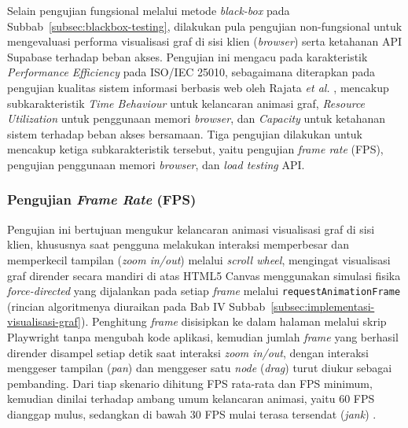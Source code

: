 Selain pengujian fungsional melalui metode \textit{black-box} pada Subbab~\ref{subsec:blackbox-testing}, dilakukan pula pengujian non-fungsional untuk mengevaluasi performa visualisasi graf di sisi klien (\textit{browser}) serta ketahanan API Supabase terhadap beban akses. Pengujian ini mengacu pada karakteristik \textit{Performance Efficiency} pada ISO/IEC 25010, sebagaimana diterapkan pada pengujian kualitas sistem informasi berbasis web oleh Rajata \textit{et al.} \cite{Rajata2026SPP}, mencakup subkarakteristik \textit{Time Behaviour} untuk kelancaran animasi graf, \textit{Resource Utilization} untuk penggunaan memori \textit{browser}, dan \textit{Capacity} untuk ketahanan sistem terhadap beban akses bersamaan. Tiga pengujian dilakukan untuk mencakup ketiga subkarakteristik tersebut, yaitu pengujian \textit{frame rate} (FPS), pengujian penggunaan memori \textit{browser}, dan \textit{load testing} API.

\subsubsection{Pengujian \textit{Frame Rate} (FPS)}
Pengujian ini bertujuan mengukur kelancaran animasi visualisasi graf di sisi klien, khususnya saat pengguna melakukan interaksi memperbesar dan memperkecil tampilan (\textit{zoom in/out}) melalui \textit{scroll wheel}, mengingat visualisasi graf dirender secara mandiri di atas HTML5 Canvas menggunakan simulasi fisika \textit{force-directed} yang dijalankan pada setiap \textit{frame} melalui \texttt{requestAnimationFrame} (rincian algoritmenya diuraikan pada Bab IV Subbab~\ref{subsec:implementasi-visualisasi-graf}). Penghitung \textit{frame} disisipkan ke dalam halaman melalui skrip Playwright tanpa mengubah kode aplikasi, kemudian jumlah \textit{frame} yang berhasil dirender disampel setiap detik saat interaksi \textit{zoom in/out}, dengan interaksi menggeser tampilan (\textit{pan}) dan menggeser satu \textit{node} (\textit{drag}) turut diukur sebagai pembanding. Dari tiap skenario dihitung FPS rata-rata dan FPS minimum, kemudian dinilai terhadap ambang umum kelancaran animasi, yaitu 60 FPS dianggap mulus, sedangkan di bawah 30 FPS mulai terasa tersendat (\textit{jank}) \cite{Zhao2025}.

